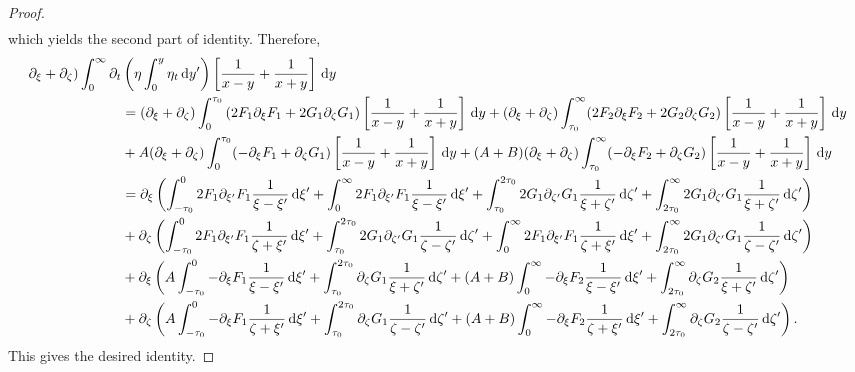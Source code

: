 \documentclass[10pt,reqno,oneside,a4paper, landscape]{article}
\begin{document}
\begin{proof}
\begin{align*}
\end{align*}
which yields the second part of identity.
Therefore,
\begin{align*}
\partial_\xi + \partial_\zeta)\int_0^\infty \partial_t &\left( \eta \int^{y}_0\eta_{t} \,\mathrm{d} y' \right) \left[ \frac{1}{x-y} + \frac{1}{x+y} \right] \,\mathrm{d} y \\
&=  (\partial_\xi + \partial_\zeta) \int_0^{\tau_0} \left( 2 F_1  \partial_\xi F_1 + 2 G_1 \partial_\zeta G_1 \right) \left[ \frac{1}{x-y} + \frac{1}{x+y} \right] \,\mathrm{d} y + (\partial_\xi + \partial_\zeta)\int_{\tau_0}^\infty (2 F_2 \partial_\xi F_2 + 2 G_2 \partial_\zeta G_2 )\left[ \frac{1}{x-y} + \frac{1}{x+y} \right] \,\mathrm{d} y \\
&+ A (\partial_\xi + \partial_\zeta)\int_0^{\tau_0} (-\partial_\xi F_1 + \partial_\zeta G_1) \left[ \frac{1}{x-y} + \frac{1}{x+y} \right] \,\mathrm{d} y + (A+B)(\partial_\xi + \partial_\zeta)\int_{\tau_0}^\infty (- \partial_\xi F_2+ \partial_\zeta G_2) \left[ \frac{1}{x-y} + \frac{1}{x+y} \right] \,\mathrm{d} y \\
&= \partial_\xi \left( \int^{0}_{-\tau_0} 2 F_1\partial_{\xi'}F_1  \frac{1}{\xi -\xi'} \,\mathrm{d} \xi' + \int_{0}^\infty 2 F_1\partial_{\xi'}F_1  \frac{1}{\xi -\xi'} \,\mathrm{d} \xi'  + \int_{\tau_0}^{2\tau_0} 2 G_1 \partial_{\zeta'} G_1 \frac{1}{\xi + \zeta'} \,\mathrm{d} \zeta' + \int_{2\tau_0}^{\infty}  2 G_1 \partial_{\zeta'} G_1 \frac{1}{\xi + \zeta'} \,\mathrm{d} \zeta'\right) \\
&+ \partial_{\zeta} \left(  \int^{0}_{-\tau_0} 2 F_1\partial_{\xi'}F_1 \frac{1}{\zeta +\xi'} \,\mathrm{d} \xi' + \int_{\tau_0}^{2\tau_0} 2 G_1 \partial_{\zeta'} G_1 \frac{1}{\zeta - \zeta'} \,\mathrm{d} \zeta' + \int_{0}^\infty 2 F_1\partial_{\xi'}F_1 \frac{1}{\zeta +\xi'} \,\mathrm{d} \xi' + \int_{2\tau_0}^{\infty}  2 G_1 \partial_{\zeta'} G_1 \frac{1}{\zeta - \zeta'} \,\mathrm{d} \zeta' \right) \\
&+ \partial_\xi \left( A \int^0_{-\tau_0} -\partial_\xi F_1 \frac{1}{\xi - \xi'} \,\mathrm{d} \xi' + \int^{2\tau_0}_{\tau_0} \partial_\zeta G_1 \frac{1}{\xi + \zeta'} \,\mathrm{d} \zeta' + (A+B)\int_0^{\infty} -\partial_\xi F_2 \frac{1}{\xi - \xi'} \,\mathrm{d} \xi' + \int_{2\tau_0}^{\infty} \partial_\zeta G_2 \frac{1}{\xi + \zeta'} \,\mathrm{d} \zeta' \right) \\
&+ \partial_\zeta \left( A \int^0_{-\tau_0} -\partial_\xi F_1  \frac{1}{\zeta + \xi'}  \,\mathrm{d} \xi' + \int^{2\tau_0}_{\tau_0} \partial_\zeta G_1 \frac{1}{\zeta - \zeta'} \,\mathrm{d} \zeta' + (A+B) \int_0^{\infty} -\partial_\xi F_2  \frac{1}{\zeta + \xi'} \,\mathrm{d} \xi'  + \int_{2\tau_0}^{\infty} \partial_\zeta G_2 \frac{1}{\zeta - \zeta'}\,\mathrm{d} \zeta'  \right).
\end{align*}
This gives the desired identity.
\end{proof}
{\small}
\end{document}
